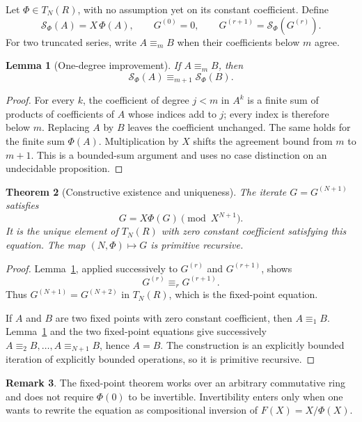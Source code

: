 \documentclass[11pt]{article}
\newtheorem{theorem}{Theorem}[section]
\newtheorem{lemma}[theorem]{Lemma}
\theoremstyle{definition}
\newtheorem{remark}[theorem]{Remark}
\begin{document}
Let \(\Phi\in T_N(R)\), with no assumption yet on its constant coefficient.
Define
\[
 \mathcal S_\Phi(A)=X\,\Phi(A),\qquad
 G^{(0)}=0,\qquad G^{(r+1)}=\mathcal S_\Phi(G^{(r)}).
\]
For two truncated series, write \(A\equiv_m B\) when their coefficients below
\(m\) agree.

\begin{lemma}[One-degree improvement]\label{lem:improve}
If \(A\equiv_m B\), then
\[
 \mathcal S_\Phi(A)\equiv_{m+1}\mathcal S_\Phi(B).
\]
\end{lemma}
\begin{proof}
For every \(k\), the coefficient of degree \(j<m\) in \(A^k\) is a finite sum
of products of coefficients of \(A\) whose indices add to \(j\); every index is
therefore below \(m\).  Replacing \(A\) by \(B\) leaves the coefficient
unchanged.  The same holds for the finite sum \(\Phi(A)\).  Multiplication by
\(X\) shifts the agreement bound from \(m\) to \(m+1\).  This is a bounded-sum
argument and uses no case distinction on an undecidable proposition.
\end{proof}

\begin{theorem}[Constructive existence and uniqueness]\label{thm:fixed}
The iterate \(G=G^{(N+1)}\) satisfies
\[
 G=X\Phi(G)\pmod {X^{N+1}}.
\]
It is the unique element of \(T_N(R)\) with zero constant coefficient satisfying
this equation.  The map \((N,\Phi)\mapsto G\) is primitive recursive.
\end{theorem}
\begin{proof}
Lemma~\ref{lem:improve}, applied successively to \(G^{(r)}\) and
\(G^{(r+1)}\), shows
\[
 G^{(r)}\equiv_r G^{(r+1)}.
\]
Thus \(G^{(N+1)}=G^{(N+2)}\) in \(T_N(R)\), which is the fixed-point equation.

If \(A\) and \(B\) are two fixed points with zero constant coefficient, then
\(A\equiv_1B\).  Lemma~\ref{lem:improve} and the two fixed-point equations give
successively \(A\equiv_2B,\ldots,A\equiv_{N+1}B\), hence \(A=B\).  The
construction is an explicitly bounded iteration of explicitly bounded
operations, so it is primitive recursive.
\end{proof}

\begin{remark}
The fixed-point theorem works over an arbitrary commutative ring and does not
require \(\Phi(0)\) to be invertible.  Invertibility enters only when one wants
to rewrite the equation as compositional inversion of \(F(X)=X/\Phi(X)\).
\end{remark}
\end{document}
